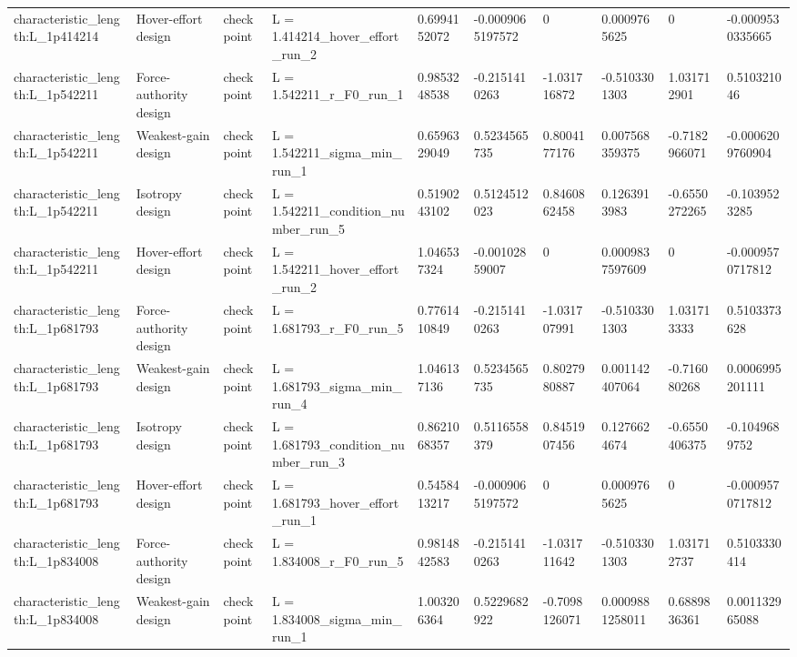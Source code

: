 \begin{tabular}{@{}llllllllll@{}}
characteristic\_length:L\_1p414214 & Hover-effort design & checkpoint & L = 1.414214\_hover\_effort\_run\_2 & 0.6994152072 & -0.0009065197572 & 0 & 0.0009765625 & 0 & -0.0009530335665 \\
characteristic\_length:L\_1p542211 & Force-authority design & checkpoint & L = 1.542211\_r\_F0\_run\_1 & 0.9853248538 & -0.2151410263 & -1.031716872 & -0.5103301303 & 1.031712901 & 0.510321046 \\
characteristic\_length:L\_1p542211 & Weakest-gain design & checkpoint & L = 1.542211\_sigma\_min\_run\_1 & 0.6596329049 & 0.5234565735 & 0.8004177176 & 0.007568359375 & -0.7182966071 & -0.0006209760904 \\
characteristic\_length:L\_1p542211 & Isotropy design & checkpoint & L = 1.542211\_condition\_number\_run\_5 & 0.5190243102 & 0.5124512023 & 0.8460862458 & 0.1263913983 & -0.6550272265 & -0.1039523285 \\
characteristic\_length:L\_1p542211 & Hover-effort design & checkpoint & L = 1.542211\_hover\_effort\_run\_2 & 1.046537324 & -0.00102859007 & 0 & 0.0009837597609 & 0 & -0.0009570717812 \\
characteristic\_length:L\_1p681793 & Force-authority design & checkpoint & L = 1.681793\_r\_F0\_run\_5 & 0.7761410849 & -0.2151410263 & -1.031707991 & -0.5103301303 & 1.031713333 & 0.5103373628 \\
characteristic\_length:L\_1p681793 & Weakest-gain design & checkpoint & L = 1.681793\_sigma\_min\_run\_4 & 1.046137136 & 0.5234565735 & 0.8027980887 & 0.001142407064 & -0.716080268 & 0.0006995201111 \\
characteristic\_length:L\_1p681793 & Isotropy design & checkpoint & L = 1.681793\_condition\_number\_run\_3 & 0.8621068357 & 0.5116558379 & 0.8451907456 & 0.1276624674 & -0.6550406375 & -0.1049689752 \\
characteristic\_length:L\_1p681793 & Hover-effort design & checkpoint & L = 1.681793\_hover\_effort\_run\_1 & 0.5458413217 & -0.0009065197572 & 0 & 0.0009765625 & 0 & -0.0009570717812 \\
characteristic\_length:L\_1p834008 & Force-authority design & checkpoint & L = 1.834008\_r\_F0\_run\_5 & 0.9814842583 & -0.2151410263 & -1.031711642 & -0.5103301303 & 1.031712737 & 0.5103330414 \\
characteristic\_length:L\_1p834008 & Weakest-gain design & checkpoint & L = 1.834008\_sigma\_min\_run\_1 & 1.003206364 & 0.5229682922 & -0.7098126071 & 0.0009881258011 & 0.6889836361 & 0.001132965088 \\

\end{tabular}
